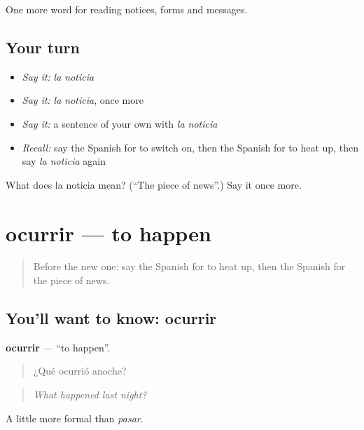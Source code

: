 \begin{grammarlens}[title={What you've built}]
One more word for reading notices, forms and messages.
\end{grammarlens}

\subsection*{Your turn}
\begin{itemize}
\raggedright
  \item \emph{Say it:} \emph{la noticia}
  \item \emph{Say it:} \emph{la noticia}, once more
  \item \emph{Say it:} a sentence of your own with \emph{la noticia}
  \item \emph{Recall:} say the Spanish for to switch on, then the Spanish for to heat up, then say \emph{la noticia} again
\end{itemize}

\begin{tcolorbox}[breakable,colback=teal!4,colframe=teal!35!black,title={Before you move on}]
What does la noticia mean? (\textquotedblleft{}The piece of news\textquotedblright{}.) Say it once more.
\end{tcolorbox}
\section[ocurrir]{ocurrir — to happen}

\label{lesson:ES-C495-ocurrir}



\begin{quote}
Before the new one: say the Spanish for to heat up, then the Spanish for the piece of news.
\end{quote}

\subsection*{You'll want to know: ocurrir}
\textbf{ocurrir} — \textquotedblleft{}to happen\textquotedblright{}.

\begin{quote}
¿Qué ocurrió anoche?
\end{quote}

\begin{quote}
\emph{What happened last night?}
\end{quote}

A little more formal than \emph{pasar}.

